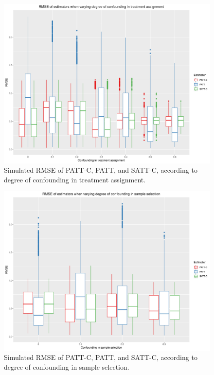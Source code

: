 \documentclass[hidelinks,12pt]{article}
\begin{document}
{\begin{appendices}
\begin{figure}[htbp]
	\begin{center}
		\includegraphics[width = 1\textwidth]{rmse_boxplots_RateConT}
		\caption{Simulated RMSE of PATT-C, PATT, and SATT-C, according to degree of confounding in treatment assignment.\label{fig:rmse_boxplots_RateConT}}
	\end{center}
\end{figure}

\begin{figure}[htbp]
	\begin{center}
		\includegraphics[width = 1\textwidth]{rmse_boxplots_RateConS}
		\caption{Simulated RMSE of PATT-C, PATT, and SATT-C, according to degree of confounding in sample selection.\label{fig:rmse_boxplots_RateConS}}
	\end{center}
\end{figure}


\end{appendices}}
\end{document}
